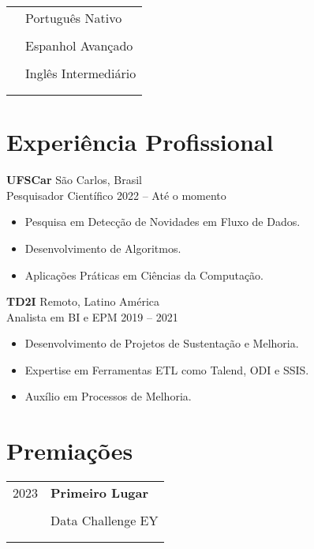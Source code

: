 \documentclass[12pt]{article}
\newcommand{\entry}[4]{{{\textbf{#1}}} \hfill #3 \\ #2 \hfill #4}
\newcommand{\tableentry}[3]{\textsc{#1} & #2\expandafter\ifstrequal\expandafter{#3}{}{\\}{\\[6pt]}}
\begin{document}
\begin{paracol}{2}
\begin{supertabular}{rl}
  \tableentry{\footnotesize\faLanguage}{Português \textperiodcentered{} Nativo}{}
  \tableentry{}{Espanhol \textperiodcentered{} Avançado}{}
  \tableentry{}{Inglês \textperiodcentered{} Intermediário}{}
\end{supertabular}

\switchcolumn*

\section{Experiência Profissional}


\entry{UFSCar}{Pesquisador Científico}{São Carlos, Brasil}{2022 -- Até o momento}
\begin{itemize}[noitemsep,leftmargin=3.5mm,rightmargin=0mm,topsep=6pt]
  \item Pesquisa em Detecção de Novidades em Fluxo de Dados.
  \item Desenvolvimento de Algoritmos.
  \item Aplicações Práticas em Ciências da Computação.
\end{itemize}

\medskip

\entry{TD2I}{Analista em BI e EPM}{Remoto, Latino América}{2019 -- 2021}
\begin{itemize}[noitemsep,leftmargin=3.5mm,rightmargin=0mm,topsep=6pt]
  \item Desenvolvimento de Projetos de Sustentação e Melhoria.
  \item Expertise em Ferramentas ETL como Talend, ODI e SSIS.
  \item Auxílio em Processos de Melhoria.
\end{itemize}

\switchcolumn


\section{Premiações}
\begin{supertabular}{rl}
  \tableentry{2023}{\textbf{Primeiro Lugar}}{}
  \tableentry{}{Data Challenge EY}{spaceafter}

\end{supertabular}

\end{paracol}

\vspace*{\fill}
\end{document}
